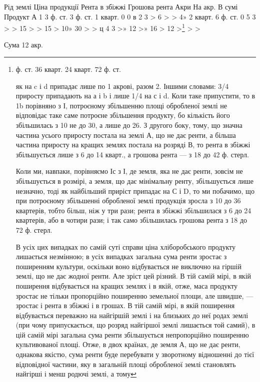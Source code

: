 Рід  землі        Ціна продукції            Рента в збіжжі    Грошова  рента
    Акри    На акр. В сумі    Продукт
А    1    3 ф. ст.    3 ф. ст.    1 кварт.    0    0
в    2    3 >           6 > >   4» 2 кварт.    6 ф. ст.
0    5    3 > >    15 > >    15 >    10» 30 > >
ц    4    3 >» 12 >» 16 >    12 >\footnote{
ф. ст. 36 кварт. 24 кварт. 72 ф. ст.

як на c і d припадає лише по 1 акрові, разом 2. Іншими словами: 3/4 приросту
припадають на а і b і лише 1/4 на с і d. Коли таке припустити, то в
1b порівняно з І, потроєному збільшенню площі обробленої землі не відповідає
таке саме потроєне збільшення продукту, бо кількість його збільшилась з 10
не до 30, а лише до 26. З другого боку, тому, що значна частина усього приросту
постала на землі А, що не дає ренти, а більша частина приросту на
кращих землях постала на розряді В, то рента в збіжжі збільшується лише
з 6 до 14 кварт., а грошова рента — з 18 до 42 ф. стерл.

Коли ми, навпаки, порівняємо Іс з І, де земля, яка не дає ренти, зовсім
не збільшується в розмірі, а земля, що дає мінімальну ренту, збільшується
лише незначно, тоді як найбільший приріст припадає на С і D, то ми побачимо,
що при потроєному збільшенні обробленої землі продукція зросла з 10 до
36 квартерів, тобто більш, ніж у три рази; рента в збіжжі збільшилася з 6 до
24 квартерів, або в чотири рази; і так само збільшилась грошова рента
з 18 до 72 ф. стерл.

В усіх цих випадках по самій суті справи ціна хліборобського продукту
лишається незмінною; в усіх випадках загальна сума ренти зростає з поширенням
культури, оскільки воно відбувається не виключно на гіршій землі, що
не дає жодної ренти. Але зріст цей різний. В тій самій мірі, в якій поширення
відбувається на кращих землях і в якій, отже, маса продукту зростає не тільки
пропорційно поширенню земельної площи, але швидше, — зростає і рента в
збіжжі і в грошах. В тій самій мірі, в якій поширення відбувається переважно
на найгіршій землі і на близьких до неї родах землі (при чому припускається,
що розряд найгіршої землі лишається той самий), в цій самій мірі загальна
сума ренти збільшується непропорційно поширенню культивованої площі. Отже,
в двох країнах, де земля А, що не дає ренти, однакова якістю, сума ренти
буде перебувати у зворотному відношенні до тієї відповідної частини, яку в загальній
площі обробленої землі становлять найгірші і менш родючі землі, а тому
} > >

Сума    12 акр.
\parbreak{}  %
